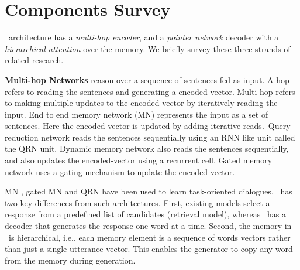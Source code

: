 
\section{Components Survey}

\sys\ architecture has a {\em multi-hop encoder}, and a {\em pointer network} decoder with a {\em hierarchical attention} over the memory. We briefly survey these three strands of related research.

\vspace{0.5ex}
\noindent
\textbf{Multi-hop Networks} reason over a sequence of sentences fed as input. A hop refers to reading the sentences and generating a encoded-vector. Multi-hop refers to making multiple updates to the encoded-vector by iteratively reading the input. End to end memory network (MN) \cite{sukhbaatar2015end} represents the input as a set of sentences. Here the encoded-vector is updated by adding iterative reads.~Query reduction network \cite{seo2016query} reads the sentences sequentially using an RNN like unit called the QRN unit. Dynamic memory network \cite{kumar2016ask} also reads the sentences sequentially, and also updates the encoded-vector using a recurrent cell. Gated memory network \cite{liu2017gated} uses a gating mechanism to update the encoded-vector. %

MN \cite{BordesW16}, gated MN and QRN have been used to learn task-oriented dialogues. \sys\ has two key differences from such architectures. First, existing models select a response from a predefined list of candidates (retrieval model), whereas \sys\ has a decoder that generates the response one word at a time. Second, the memory in \sys\ is hierarchical, i.e., each memory element is a sequence of words vectors rather than just a single utterance vector. This enables the generator to copy any word from the memory during generation.


